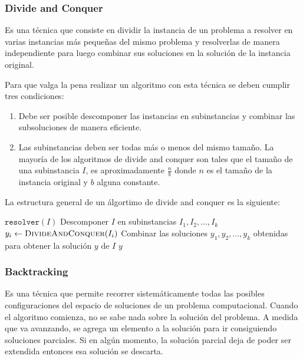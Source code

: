 \subsubsection{Divide and Conquer}
Es una técnica que consiste en dividir la instancia de un problema a resolver en varias instancias más pequeñas del mismo problema y resolverlas de manera independiente para luego combinar sus soluciones en la solución de la instancia original. 

Para que valga la pena realizar un algoritmo con esta técnica se deben cumplir tres condiciones:

\begin{enumerate}
	\item Debe ser posible descomponer las instancias en subinstancias y combinar las subsoluciones de manera eficiente.
	\item Las subinstancias deben ser todas más o menos del mismo tamaño. La mayoría de los algoritmos de divide and conquer son tales que el tamaño de una subinstancia \(I\), es aproximadamente \(\frac{n}{b}\) donde \(n\) es el tamaño de la instancia original y \(b\) alguna constante.
\end{enumerate}

La estructura general de un álgortimo de divide and conquer es la siguiente:

\begin{algorithmic}
		\Return \(\texttt{resolver}(I)\)
	\Else
		\State Descomponer \(I\) en subinstancias \(I_1, I_2,\dots, I_k\)
			\State \(y_i \gets \Call{DivideAndConquer}{I_i}\)
		\EndFor
		\State Combinar las soluciones \(y_1, y_2,\dots, y_k\) obtenidas para obtener la solución \(y\) de \(I\)
		\State\Return \(y\)
	\EndIf

	\EndFunction
\end{algorithmic}

\subsubsection{Backtracking}
Es una técnica que permite recorrer sistemáticamente todas las posibles configuraciones del espacio de soluciones de un problema computacional. Cuando el algoritmo comienza, no se sabe nada sobre la solución del problema. A medida que va avanzando, se agrega un elemento a la solución para ir consiguiendo soluciones parciales. Si en algún momento, la solución parcial deja de poder ser extendida entonces esa solución se descarta.

